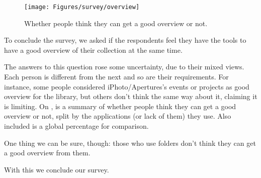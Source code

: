 \begin{figure}
	\vspace{-20pt}
	\begin{center}
		\texttt{[image: Figures/survey/overview]}
	\end{center}
	\vspace{-20pt}
	\caption{Whether people think they can get a good overview or not.}
	\vspace{-5pt}
	\label{fig:us:overview}
\end{figure}

To conclude the survey, we asked if the respondents feel they have the tools to have a good overview of their collection at the same time.

The answers to this question rose some uncertainty, due to their mixed views. Each person is different from the next and so are their requirements. For instance, some people considered iPhoto/Apertures's events or projects as good overview for the library, but others don't think the same way about it, claiming it is limiting. On , is a summary of whether people think they can get a good overview or not, split by the applications (or lack of them) they use. Also included is a global percentage for comparison.

One thing we can be sure, though: those who use folders don't think they can get a good overview from them.



\vspace{\baselineskip}

With this we conclude our survey.






\cleardoublepage

